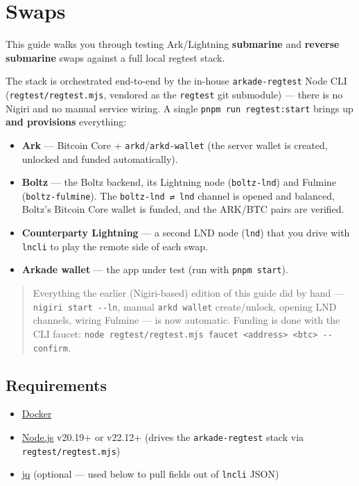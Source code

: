 \documentclass[
]{article}
\author{}
\date{}
\providecommand{\tightlist}{%
  \setlength{\itemsep}{0pt}\setlength{\parskip}{0pt}}
\begin{document}
\hypertarget{swaps}{%
\section{Swaps}\label{swaps}}

This guide walks you through testing Ark/Lightning \textbf{submarine}
and \textbf{reverse submarine} swaps against a full local regtest stack.

The stack is orchestrated end-to-end by the in-house
\texttt{arkade-regtest} Node CLI (\texttt{regtest/regtest.mjs}, vendored
as the \texttt{regtest} git submodule) --- there is no Nigiri and no
manual service wiring. A single \texttt{pnpm\ run\ regtest:start} brings
up \textbf{and provisions} everything:

\begin{itemize}
\tightlist
\item
  \textbf{Ark} --- Bitcoin Core + \texttt{arkd}/\texttt{arkd-wallet}
  (the server wallet is created, unlocked and funded automatically).
\item
  \textbf{Boltz} --- the Boltz backend, its Lightning node
  (\texttt{boltz-lnd}) and Fulmine (\texttt{boltz-fulmine}). The
  \texttt{boltz-lnd\ ⇄\ lnd} channel is opened and balanced, Boltz's
  Bitcoin Core wallet is funded, and the ARK/BTC pairs are verified.
\item
  \textbf{Counterparty Lightning} --- a second LND node (\texttt{lnd})
  that you drive with \texttt{lncli} to play the remote side of each
  swap.
\item
  \textbf{Arkade wallet} --- the app under test (run with
  \texttt{pnpm\ start}).
\end{itemize}

\begin{quote}
Everything the earlier (Nigiri-based) edition of this guide did by hand
--- \texttt{nigiri\ start\ -\/-ln}, manual \texttt{arkd\ wallet}
create/unlock, opening LND channels, wiring Fulmine --- is now
automatic. Funding is done with the CLI faucet:
\texttt{node\ regtest/regtest.mjs\ faucet\ \textless{}address\textgreater{}\ \textless{}btc\textgreater{}\ -\/-confirm}.
\end{quote}

\hypertarget{requirements}{%
\subsection{Requirements}\label{requirements}}

\begin{itemize}
\tightlist
\item
  \href{https://docs.docker.com/engine/install/}{Docker}
\item
  \href{https://nodejs.org/}{Node.js} v20.19+ or v22.12+ (drives the
  \texttt{arkade-regtest} stack via \texttt{regtest/regtest.mjs})
\item
  \href{https://formulae.brew.sh/formula/jq}{jq} (optional --- used
  below to pull fields out of \texttt{lncli} JSON)
\end{itemize}
\end{document}
